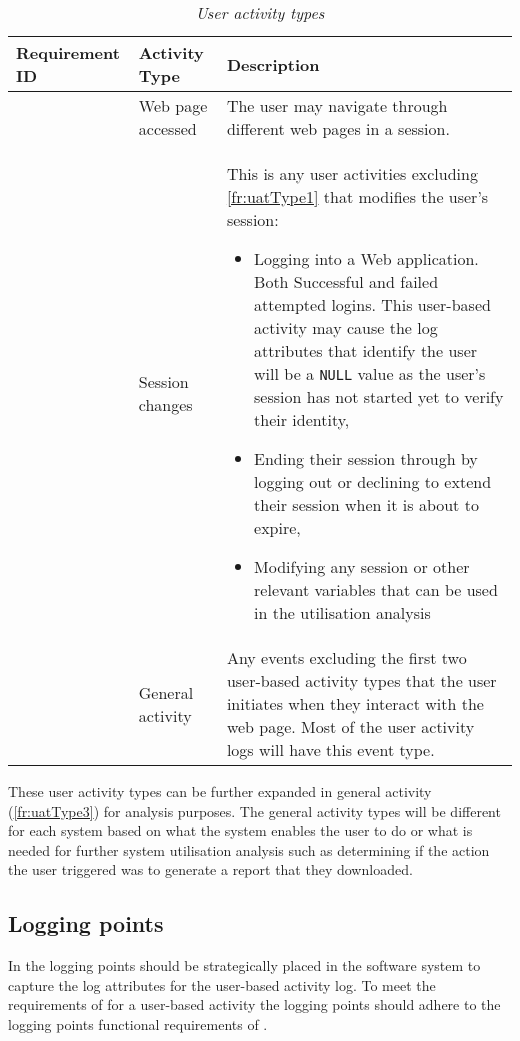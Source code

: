 \begin{table}[!htb]
	\centering
	\caption[User activity types]
	{\textit{User activity types}}
	\label{tbl:ch2_userActivityTypes}
	\begin{tabularx}{\textwidth}{|l|l|X|}
		\hline \textbf{Requirement ID} & \textbf{Activity Type} & \textbf{Description} \\
		\hline \subsubphase{fr:uatType1} & Web page accessed & The user may navigate through different web pages in a session.\\
		\hline \subsubphase{fr:uatType2} & Session changes & This is any user activities excluding \ref{fr:uatType1} that modifies the user's session:
		\begin{itemize}
			\item Logging into a Web application. Both Successful and failed attempted logins. This user-based activity may cause the log attributes that identify the user will be a \texttt{NULL} value as the user's session has not started yet to verify their identity,
			\item Ending their session through by logging out or declining to extend their session when it is about to expire,
			\item Modifying any session or other relevant variables that can be used in the utilisation analysis
		\end{itemize}\\
		\hline \subsubphase{fr:uatType3} & General activity & Any events excluding the first two user-based activity types that the user initiates when they interact with the web page. Most of the user activity logs will
		have this event type.\\ 
		\hline
	\end{tabularx}
\end{table}

These user activity types can be further expanded in general activity (\ref{fr:uatType3}) for analysis purposes. The general activity types will be different for each system based on what the system enables the user to do or what is needed for further system utilisation analysis such as determining if the action the user triggered was to generate a report that they downloaded.

\clearpage

\subsection{Logging points}\label{sec:ch2_loggingPoints}
In  the logging points should be strategically placed in the software system to capture the log attributes for the user-based activity log. To meet the requirements of  for a user-based activity the logging points should adhere to the logging points functional requirements of .

